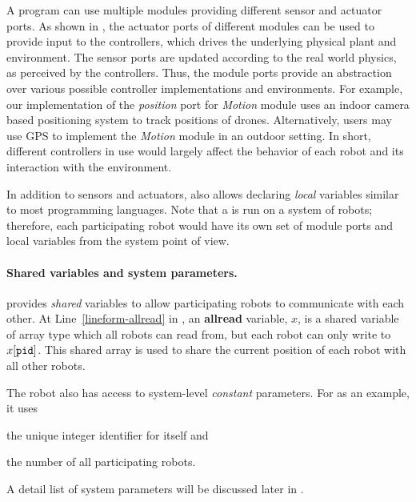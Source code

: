 A \lgname program can use multiple modules providing different sensor and actuator ports.
As shown in , the actuator ports of different modules can be used to provide input to the controllers,
which drives the underlying physical plant and environment.
The sensor ports are  updated according to the real world physics, as perceived by the controllers.
%
%
Thus, the module ports provide an abstraction over various possible controller implementations and environments.
For example, our implementation of the \emph{position} port for \emph{Motion} module uses an indoor camera based positioning system to track positions of drones.
Alternatively, users may use GPS to implement the \emph{Motion} module in an outdoor setting.
In short, different controllers in use would largely affect the behavior of each robot and its interaction with the environment.

In addition to sensors and actuators, \lgname also allows declaring \emph{local} variables similar to most programming languages.
Note that a \lgname is run on a system of robots;
therefore, each participating robot would have its own set of module ports and local variables from the system point of view.
%
%
\paragraph{Shared variables and system parameters.}
\lgname provides \emph{shared} variables to allow participating robots to communicate with each other.
At Line~\ref{lineform-allread} in , an \textbf{allread} variable, $x$, is a shared variable of array type which all robots can read from,
but each robot \myuin can only write to $x[\texttt{pid}]$.
This shared array is used to share the current position of each robot with all other robots.

The robot also has access to system-level \emph{constant} parameters.
For \LineForm as an example, it uses
\begin{inparaenum}[(a)]
    \item the unique integer identifier \myuin for itself and
    \item the number \NMAX of all participating robots.
\end{inparaenum}
A detail list of system parameters will be discussed later in .


